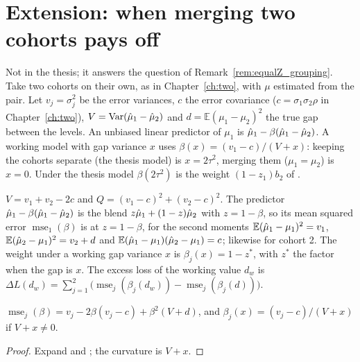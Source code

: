 \chapter{Extension: when merging two cohorts pays off}\label{ch:merging}

Not in the thesis; it answers the question of
Remark~\ref{rem:equalZ_grouping}. Take two cohorts on their own, as in
Chapter~\ref{ch:two}, with $\mu$ estimated from the pair. Let
$v_j = \sigma_j^2$ be the error variances, $c$ the error covariance
($c = \sigma_1\sigma_2\rho$ in Chapter~\ref{ch:two}),
$V = \operatorname{Var}(\hat\mu_1 - \hat\mu_2)$ and $d = \mathbb{E}(\mu_1-\mu_2)^2$
the true gap between the levels. An unbiased linear predictor of $\mu_1$ is
$\hat\mu_1 - \beta(\hat\mu_1 - \hat\mu_2)$. A working model with gap variance $x$ uses
$\beta(x) = (v_1 - c)/(V + x)$: keeping the cohorts separate (the thesis model)
is $x = 2\tau^2$, merging them ($\mu_1 = \mu_2$) is $x = 0$. Under the thesis
model $\beta(2\tau^2)$ is the weight $(1 - z_1)b_2$ of .

\begin{definition}\label{def:merging}
  \leanok
  $V = v_1 + v_2 - 2c$ and $Q = (v_1 - c)^2 + (v_2 - c)^2$. The predictor
  $\hat\mu_1 - \beta(\hat\mu_1 - \hat\mu_2)$ is the blend $z\hat\mu_1 + (1-z)\hat\mu_2$ with
  $z = 1 - \beta$, so its mean squared error $\operatorname{mse}_1(\beta)$ is
   at $z = 1 - \beta$, for the second moments
  $\mathbb E(\hat\mu_1 - \mu_1)^2 = v_1$,
  $\mathbb E(\hat\mu_2 - \mu_1)^2 = v_2 + d$ and
  $\mathbb E(\hat\mu_1 - \mu_1)(\hat\mu_2 - \mu_1) = c$; likewise for cohort 2. The
  weight under a working gap variance $x$ is $\beta_j(x) = 1 - z^*$, with
  $z^*$ the factor  when the gap is $x$. The excess loss of the
  working value $d_w$ is
  $\Delta L(d_w) = \sum_{j=1}^2 \bigl(\operatorname{mse}_j(\beta_j(d_w)) -
  \operatorname{mse}_j(\beta_j(d))\bigr)$.
\end{definition}

\begin{lemma}\label{lem:merging_apply}
  \leanok
  $\operatorname{mse}_j(\beta) = v_j - 2\beta(v_j - c) + \beta^2(V + d)$, and
  $\beta_j(x) = (v_j - c)/(V + x)$ if $V + x \ne 0$.
\end{lemma}
\begin{proof}
  \leanok
  Expand  and ; the curvature is $V + x$.
\end{proof}

